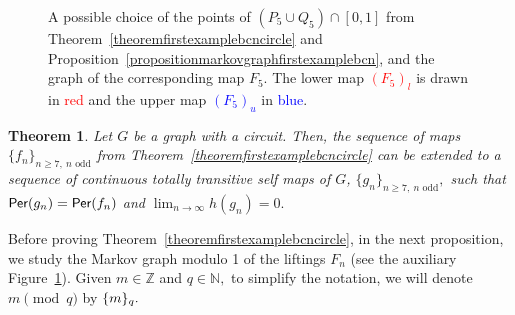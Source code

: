 \documentclass[a4paper, 11pt]{amsart}
\numberwithin{equation}{section}
\newtheorem{theorem}{Theorem}[section]
\theoremstyle{customnumberedtheorem}
\theoremstyle{definitionwithbfnote}
\newcommand{\N}{\ensuremath{\mathbb{N}}}
\newcommand{\Z}{\ensuremath{\mathbb{Z}}}
\DeclareMathOperator{\Per}{\textsf{\upshape Per}}
\newcommand{\modulo}[2]{\{#1\}\sb{#2}}
\begin{document}
\begin{figure}[ht]
\caption{A possible choice of the points of
$(P_5 \cup Q_5) \cap [0,1]$ from
Theorem~\ref{theoremfirstexamplebcncircle} and
Proposition~\ref{propositionmarkovgraphfirstexamplebcn},
and the graph of the corresponding map $F_5$.
The lower map \textcolor{red}{$(F_5)_l$} is drawn in \textcolor{red}{red} and
the upper map \textcolor{blue}{$(F_5)_u$} in \textcolor{blue}{blue}.}\label{figuretheoremfirstexamplebcncircle}
\end{figure}

\begin{theorem}\label{theoremfirstexamplebcngraph}
Let $G$ be a graph with a circuit. Then, the sequence of maps
$\{f_n\}_{n\ge 7, \ n\text{ odd}}$ from
Theorem~\ref{theoremfirstexamplebcncircle}
can be extended to a sequence
of continuous totally transitive self maps of $G$,
$\{g_n\}_{n\ge 7, \ n\text{ odd}},$
such that
$\Per(g_n) = \Per(f_n)$ and $\lim_{n\to\infty} h(g_n) = 0.$
\end{theorem}

Before proving Theorem~\ref{theoremfirstexamplebcncircle}, in the next
proposition, we study the Markov graph  modulo 1 of the liftings $F_n$
(see the auxiliary Figure~\ref{figuretheoremfirstexamplebcncircle}).
Given $m \in \Z$ and $q \in \N,$ to simplify the notation,
we will denote ${m \pmod{q}}$ by $\modulo{m}{q}.$
\end{document}
